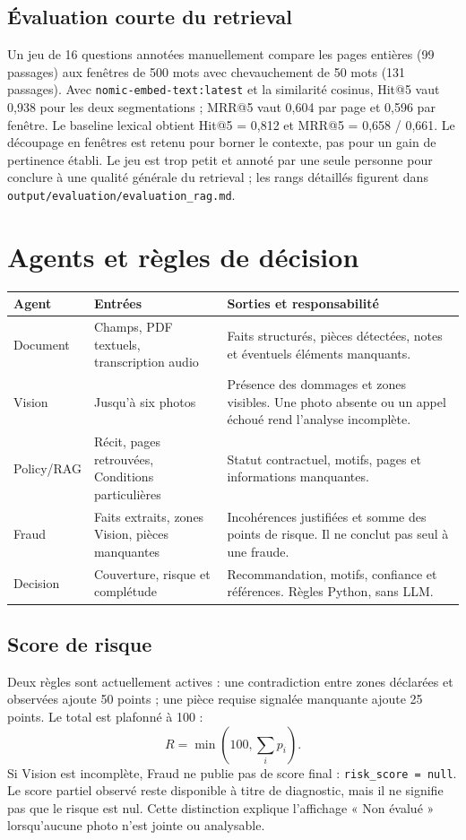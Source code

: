 \documentclass[10pt,a4paper]{article}
\newcommand{\code}[1]{\texttt{\small #1}}
\newcommand{\strong}[1]{\textbf{#1}}
\begin{document}
\subsection*{Évaluation courte du retrieval}
Un jeu de 16 questions annotées manuellement compare les pages entières (99 passages) aux fenêtres de 500 mots avec chevauchement de 50 mots (131 passages). Avec \code{nomic-embed-text:latest} et la similarité cosinus, Hit@5 vaut 0,938 pour les deux segmentations ; MRR@5 vaut 0,604 par page et 0,596 par fenêtre. Le baseline lexical obtient Hit@5 = 0,812 et MRR@5 = 0,658 / 0,661. Le découpage en fenêtres est retenu pour borner le contexte, pas pour un gain de pertinence établi. Le jeu est trop petit et annoté par une seule personne pour conclure à une qualité générale du retrieval ; les rangs détaillés figurent dans \code{output/evaluation/evaluation\_rag.md}.

\newpage
\section{Agents et règles de décision}
\begin{tabularx}{\textwidth}{@{}p{2.3cm}p{3.8cm}X@{}}
\toprule
\strong{Agent} & \strong{Entrées} & \strong{Sorties et responsabilité}\\
\midrule
Document & Champs, PDF textuels, transcription audio & Faits structurés, pièces détectées, notes et éventuels éléments manquants.\\
Vision & Jusqu’à six photos & Présence des dommages et zones visibles. Une photo absente ou un appel échoué rend l’analyse incomplète.\\
Policy/RAG & Récit, pages retrouvées, Conditions particulières & Statut contractuel, motifs, pages et informations manquantes.\\
Fraud & Faits extraits, zones Vision, pièces manquantes & Incohérences justifiées et somme des points de risque. Il ne conclut pas seul à une fraude.\\
Decision & Couverture, risque et complétude & Recommandation, motifs, confiance et références. Règles Python, sans LLM.\\
\bottomrule
\end{tabularx}

\subsection*{Score de risque}
Deux règles sont actuellement actives : une contradiction entre zones déclarées et observées ajoute 50 points ; une pièce requise signalée manquante ajoute 25 points. Le total est plafonné à 100 :
\[
R = \min\left(100,\sum_i p_i\right).
\]
Si Vision est incomplète, Fraud ne publie pas de score final : \code{risk\_score = null}. Le score partiel observé reste disponible à titre de diagnostic, mais il ne signifie pas que le risque est nul. Cette distinction explique l’affichage « Non évalué » lorsqu’aucune photo n’est jointe ou analysable.
\end{document}
